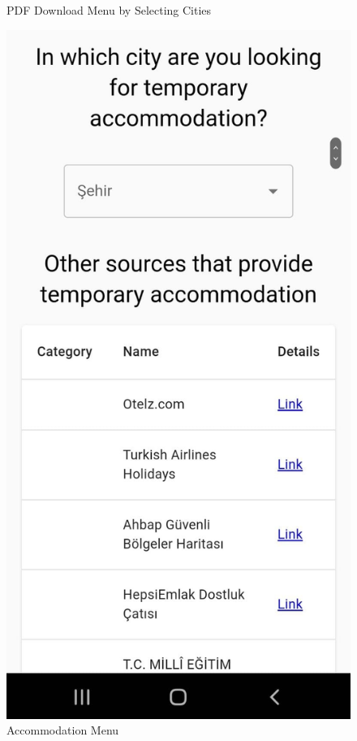 \begin{figure}[H]
\begin{center}
        \caption[PDF Download Menu]{PDF Download Menu by Selecting Cities}
    \end{center}
\end{figure}


\begin{figure}[H]
    \begin{center}
        \includegraphics[scale = 0.15]{assets/accommodation.jpeg}
        \caption[Accommodation Menu]{Accommodation Menu}
    \end{center}
\end{figure}

